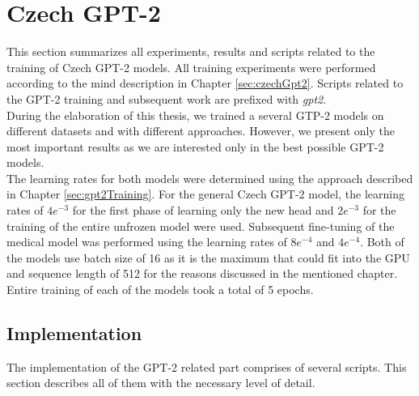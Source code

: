 \section{Czech GPT-2}
\label{sec:gpt2Experiments}
This section summarizes all experiments, results and scripts related to the training of Czech GPT-2 models. All training experiments were performed according to the mind description in Chapter \ref{sec:czechGpt2}. Scripts related to the GPT-2 training and subsequent work are prefixed with \textit{gpt2}.\\

During the elaboration of this thesis, we trained a several GTP-2 models on different datasets and with different approaches. However, we present only the most important results as we are interested only in the best possible GPT-2 models.\\

The learning rates for both models were determined using the approach described in Chapter \ref{sec:gpt2Training}. For the general Czech GPT-2 model, the learning rates of $4e^{-3}$ for the first phase of learning only the new head and $2e^{-3}$ for the training of the entire unfrozen model were used. Subsequent fine-tuning of the medical model was performed using the learning rates of $8e^{-4}$ and $4e^{-4}$. Both of the models use batch size of 16 as it is the maximum that could fit into the GPU and sequence length of 512 for the reasons discussed in the mentioned chapter. Entire training of each of the models took a total of 5 epochs.

\subsection{Implementation}
The implementation of the GPT-2 related part comprises of several scripts. This section describes all of them with the necessary level of detail.

